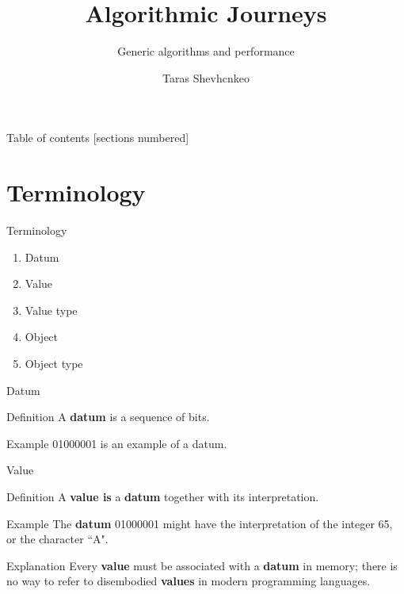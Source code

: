 \documentclass[10pt]{beamer}
\title{Algorithmic Journeys}
\subtitle{Generic algorithms and performance}
\date{}
\author{Taras Shevhcnkeo}
\institute{Rails Reactor}
\begin{document}
\maketitle

\begin{frame}{Table of contents}
  [sections numbered]
  \tableofcontents[hideallsubsections]
\end{frame}

\section{Terminology}

\begin{frame}[fragile]{Terminology}
  \begin{enumerate}
    \item Datum
    \item Value
    \item Value type
    \item Object
    \item Object type
  \end{enumerate}
\end{frame}



\begin{frame}[fragile]{Datum}
\begin{block}{Definition}
A \textbf{datum} is a sequence of bits.
\end{block}

\begin{block}{Example}
01000001 is an example of a datum.
\end{block}

\end{frame}

\begin{frame}[fragile]{Value}
\begin{block}{Definition}
A \textbf{value is} a \textbf{datum} together with its interpretation.
\end{block}
\begin{block}{Example}
The \textbf{datum} 01000001 might have the interpretation of the integer 65, or the character “A".
\end{block}
\begin{block}{Explanation}
Every \textbf{value} must be associated with a \textbf{datum} in memory; there is no way to refer to disembodied \textbf{values} in modern programming languages.
\end{block}
\end{frame}
\end{document}

